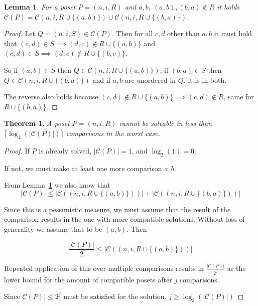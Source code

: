 \documentclass[10pt,journal,compsoc]{IEEEtran}
\newtheorem{theorem}{Theorem}
\newtheorem{lemma}{Lemma}
\begin{document}
\begin{lemma}\label{lemma:compatible_union}
  For a poset $P = (n, i, R)$ and $a, b$, $(a, b), (b, a)\notin R$ it holds $\mathcal{C}(P) = \mathcal{C}(n, i, R\cup \{(a, b)\}) \cup \mathcal{C}(n, i, R\cup \{(b, a)\})$.
\end{lemma}

\begin{proof}
  Let $Q = (n, i, S)\in \mathcal{C}(P)$.
  Then for all $c, d$ other than $a, b$ it must hold that $(c, d)\in S\implies (d,c)\notin R\cup \{(a, b)\}$ and $(c, d)\in S\implies (d, c)\notin R\cup \{(b, c)\}$.

  So if $(a, b)\in S$ then $Q\in\mathcal{C}(n, i, R\cup \{(a, b)\})$, if $(b, a)\in S$ then $Q\in\mathcal{C}(n, i, R\cup \{(b, a)\})$
  and if $a, b$ are unordered in $Q$, it is in both.

  The reverse also holds because $(c, d)\notin R\cup \{(a, b)\}\implies (c, d)\notin R$, same for $R\cup \{(b, a)\}$.
\end{proof}

\begin{theorem}\label{theorem:compatible_log}
  A poset $P=(n,i,R)$ cannot be solvable in less than $\lceil\log_2(|\mathcal{C}(P)|)\rceil$ comparisons in the worst case.
\end{theorem}

\begin{proof}
  If $P$ is already solved, $|\mathcal{C}(P)|=1$, and $\log_2(1)=0$.

  If not, we must make at least one more comparison $a, b$.

  From Lemma~\ref{lemma:compatible_union} we also know that
  $$|\mathcal{C}(P)| \leq |\mathcal{C}((n,i,R\cup \{(a, b)\}))| + |\mathcal{C}((n,i,R\cup \{(b, a)\}))|$$

  Since this is a pessimistic measure, we must assume that the result of the comparison results in the one with more compatible solutions.
  Without loss of generality we assume that to be $(a, b)$.
  Then

  $$\frac{|\mathcal{C}(P)|}{2}\leq |\mathcal{C}((n,i,R\cup \{(a, b)\}))|$$

  Repeated application of this over multiple comparisons results in $\frac{|\mathcal{C}(P)|}{2^j}$ as the lower bound for the amount of compatible posets after $j$ comparisons.

  Since $\mathcal{C}(P)|\leq 2^j$ must be satisfied for the solution, $j\geq\log_2(|\mathcal{C}(P)|)$
\end{proof}
\end{document}

